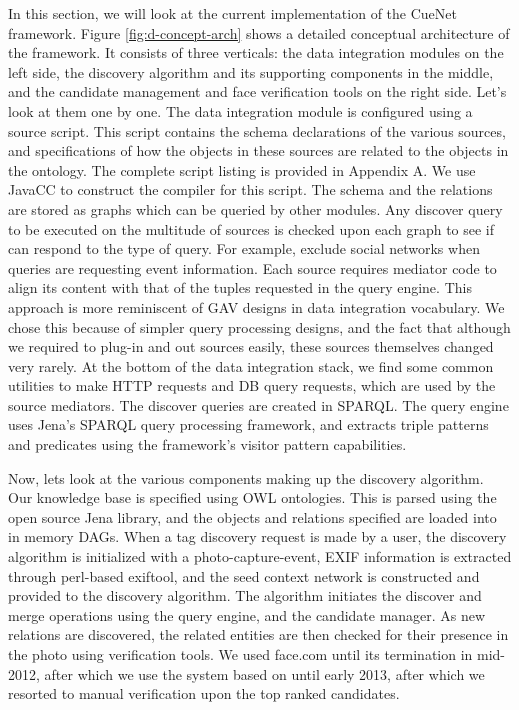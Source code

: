 In this section, we will look at the current implementation of the CueNet framework. Figure \ref{fig:d-concept-arch} shows a detailed conceptual architecture of the framework. It consists of three verticals: the data integration modules on the left side, the discovery algorithm and its supporting components in the middle, and the candidate management and face verification tools on the right side. Let's look at them one by one. The data integration module is configured using a source script. This script contains the schema declarations of the various sources, and specifications of how the objects in these sources are related to the objects in the ontology. The complete script listing is provided in Appendix A. We use JavaCC to construct the compiler for this script. The schema and the relations are stored as graphs which can be queried by other modules. Any discover query to be executed on the multitude of sources is checked upon each graph to see if can respond to the type of query. For example, exclude social networks when queries are requesting event information. Each source requires mediator code to align its content with that of the tuples requested in the query engine. This approach is more reminiscent of GAV designs in data integration vocabulary. We chose this because of simpler query processing designs, and the fact that although we required to plug-in and out sources easily, these sources themselves changed very rarely. At the bottom of the data integration stack, we find some common utilities to make HTTP requests and DB query requests, which are used by the source mediators. The discover queries are created in SPARQL. The query engine uses Jena's SPARQL query processing framework, and extracts triple patterns and predicates using the framework's visitor pattern capabilities.

Now, lets look at the various components making up the discovery algorithm. Our knowledge base is specified using OWL ontologies. This is parsed using the open source Jena library, and the objects and relations specified are loaded into in memory DAGs. When a tag discovery request is made by a user, the discovery algorithm is initialized with a photo-capture-event, EXIF information is extracted through perl-based exiftool, and the seed context network is constructed and provided to the discovery algorithm. The algorithm initiates the discover and merge operations using the query engine, and the candidate manager. As new relations are discovered, the related entities are then checked for their presence in the photo using verification tools. We used face.com until its termination in mid-2012, after which we use the system based on \cite{nk_attribute_classifiers} until early 2013, after which we resorted to manual verification upon the top ranked candidates.

